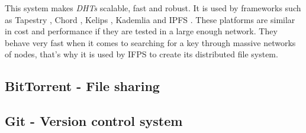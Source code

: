 This system makes \emph{DHTs} scalable, fast and robust. It is used by
frameworks such as Tapestry \cite{zhao2004tapestry}, Chord \cite{stoica2001chord}, Kelips
\cite{gupta2003kelips}, Kademlia \cite{maymounkov2002kademlia} and IPFS
\cite{benet2014ipfs}. These platforms are similar in cost and performance if
they are tested in a large enough network. They behave very fast when it comes
to searching for a key through massive networks of nodes\cite{li2004comparing},
that's why it is used by IFPS to create its distributed file system.

\subsection{BitTorrent - File sharing}
\subsection{Git - Version control system}





